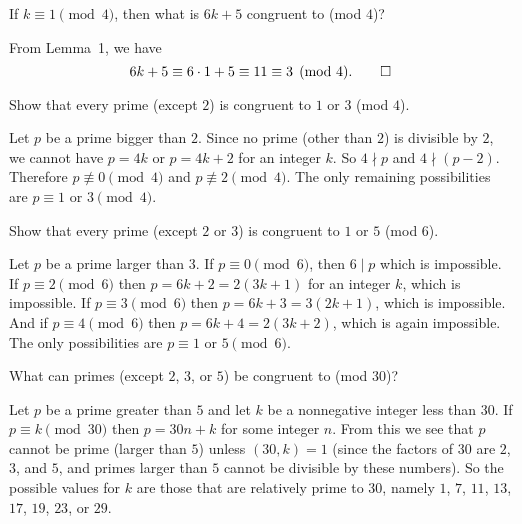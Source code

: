  If $k\equiv1\pmod4$, then what is $6k+5$ congruent to (mod
$4$)?
\begin{solution}
  From Lemma~1, we have
  \begin{equation*}
    6k+5\equiv6\cdot1+5\equiv11\equiv3\pmod4. \qedhere
  \end{equation*}
\end{solution}

 Show that every prime (except $2$) is congruent to $1$ or
$3$ (mod $4$).
\begin{solution}
  Let $p$ be a prime bigger than $2$. Since no prime (other than $2$)
  is divisible by $2$, we cannot have $p = 4k$ or $p = 4k + 2$ for an
  integer $k$. So $4\nmid p$ and $4\nmid(p-2)$. Therefore
  $p\not\equiv0\pmod4$ and $p\not\equiv2\pmod4$. The only remaining
  possibilities are $p\equiv1$ or $3\pmod4$.
\end{solution}

 Show that every prime (except $2$ or $3$) is congruent to
$1$ or $5$ (mod $6$).
\begin{solution}
  Let $p$ be a prime larger than $3$. If $p\equiv0\pmod6$, then
  $6\mid p$ which is impossible. If $p\equiv2\pmod6$ then
  $p = 6k + 2 = 2(3k + 1)$ for an integer $k$, which is impossible. If
  $p\equiv3\pmod6$ then $p = 6k + 3 = 3(2k + 1)$, which is
  impossible. And if $p\equiv4\pmod6$ then $p = 6k + 4 = 2(3k + 2)$,
  which is again impossible. The only possibilities are $p\equiv1$ or
  $5\pmod6$.
\end{solution}

 What can primes (except $2$, $3$, or $5$) be congruent to
(mod $30$)?
\begin{solution}
  Let $p$ be a prime greater than $5$ and let $k$ be a nonnegative
  integer less than $30$. If $p\equiv k\pmod{30}$ then $p = 30n + k$
  for some integer $n$. From this we see that $p$ cannot be prime
  (larger than $5$) unless $(30,k) = 1$ (since the factors of $30$ are
  $2$, $3$, and $5$, and primes larger than $5$ cannot be divisible by
  these numbers). So the possible values for $k$ are those that are
  relatively prime to $30$, namely $1$, $7$, $11$, $13$, $17$, $19$,
  $23$, or $29$.
\end{solution}
